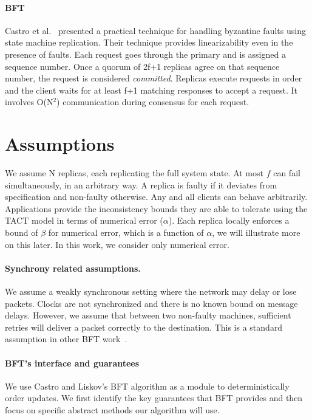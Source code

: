 \documentclass[twocolumn,10pt]{article}
\begin{document}
\paragraph{BFT} Castro et al.~\cite{Castro1999} presented a practical technique for handling
byzantine faults using state machine replication. Their technique provides
linearizability even in the presence of faults. Each request goes through
the primary and is assigned a sequence number. Once a quorum of 2f+1 replicas
agree on that sequence number, the request is considered \textit{committed}.
Replicas execute requests in order and the client waits for at least f+1 matching
responses to accept a request. It involves O(N$^{2}$) communication
during consensus for each request. 


\section{Assumptions}
We assume N replicas, each replicating the full system state. At most $f$ can 
fail simultaneously, in an arbitrary way. A replica is faulty if it deviates from
specification and non-faulty otherwise. Any and all clients can behave arbitrarily.  
Applications provide the inconsistency bounds they are able to tolerate 
using the TACT model in terms of numerical error ($\alpha$).
Each replica locally enforces a bound of $\beta$ for numerical error, which is
a function of $\alpha$, we will illustrate more on this later. In this work,
we consider only numerical error.


\paragraph{Synchrony related assumptions.} We assume a weakly synchronous
setting where the network may delay or lose packets. Clocks are not synchronized
and there is no known bound on message delays. However, we assume that between
two non-faulty machines, sufficient retries will deliver a packet correctly to
the destination. This is a standard assumption in other BFT work~\cite{Castro1999}.

\paragraph{BFT's interface and guarantees}
We use Castro and Liskov's BFT algorithm as a module to deterministically
order updates. We first identify the key guarantees that BFT provides and then
focus on specific abstract methods our algorithm will use.
\end{document}
